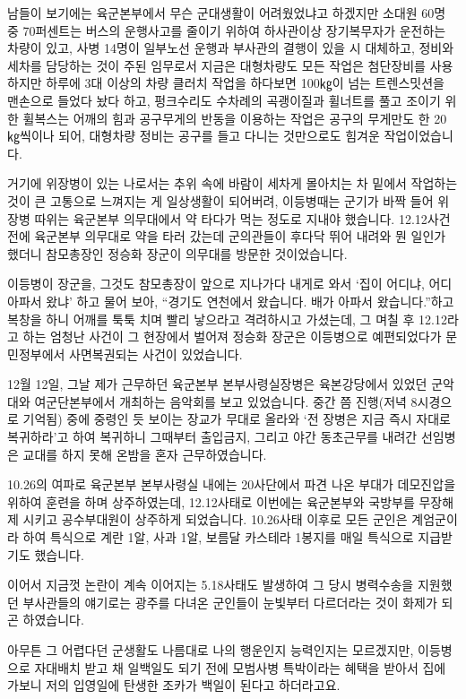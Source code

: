 \documentclass[chapter,book,openany,twoside]{oblivoir}
\begin{document}
남들이 보기에는 육군본부에서 무슨 군대생활이 어려웠었냐고 하겠지만 소대원 60명 중 70퍼센트는 버스의 운행사고를 줄이기 위하여 하사관이상 장기복무자가 운전하는 차량이 있고, 사병 14명이 일부노선 운행과 부사관의 결행이 있을 시 대체하고, 정비와 세차를 담당하는 것이 주된 임무로서 지금은 대형차량도 모든 작업은 첨단장비를 사용하지만 하루에 3대 이상의 차량 클러치 작업을 하다보면 100㎏이 넘는 트렌스밋션을 맨손으로 들었다 놨다 하고, 펑크수리도 수차례의 곡괭이질과 휠너트를 풀고 조이기 위한 휠복스는 어깨의 힘과 공구무게의 반동을 이용하는 작업은 공구의 무게만도 한 20㎏씩이나 되어, 대형차량 정비는 공구를 들고 다니는 것만으로도 힘겨운 작업이었습니다.

거기에 위장병이 있는 나로서는 추위 속에 바람이 세차게 몰아치는 차 밑에서 작업하는 것이 큰 고통으로 느껴지는 게 일상생활이 되어버려, 이등병때는 군기가 바짝 들어 위장병 따위는 육군본부 의무대에서 약 타다가 먹는 정도로 지내야 했습니다. 12.12사건 전에 육군본부 의무대로 약을 타러 갔는데 군의관들이 후다닥 뛰어 내려와 뭔 일인가 했더니 참모총장인 정승화 장군이 의무대를 방문한 것이었습니다.

이등병이 장군을, 그것도 참모총장이 앞으로 지나가다 내게로 와서 `집이 어디냐, 어디 아파서 왔냐' 하고 물어 보아, ``경기도 연천에서 왔습니다. 배가 아파서 왔습니다.''하고 복창을 하니 어깨를 툭툭 치며 빨리 낳으라고 격려하시고 가셨는데, 그 며칠 후 12.12라고 하는 엄청난 사건이 그 현장에서 벌어져 정승화 장군은 이등병으로 예편되었다가 문민정부에서 사면복권되는 사건이 있었습니다.

12월 12일, 그날 제가 근무하던 육군본부 본부사령실장병은 육본강당에서 있었던 군악대와 여군단본부에서 개최하는 음악회를 보고 있었습니다. 중간 쯤 진행(저녁 8시경으로 기억됨) 중에 중령인 듯 보이는 장교가 무대로 올라와 `전 장병은 지금 즉시 자대로 복귀하라'고 하여 복귀하니 그때부터 출입금지, 그리고 야간 동초근무를 내려간 선임병은 교대를 하지 못해 온밤을 혼자 근무하였습니다.

10.26의 여파로 육군본부 본부사령실 내에는 20사단에서 파견 나온 부대가 데모진압을 위하여 훈련을 하며 상주하였는데, 12.12사태로 이번에는 육군본부와 국방부를 무장해제 시키고 공수부대원이 상주하게 되었습니다. 10.26사태 이후로 모든 군인은 계엄군이라 하여 특식으로 계란 1알, 사과 1알, 보름달 카스테라 1봉지를 매일 특식으로 지급받기도 했습니다.

이어서 지금껏 논란이 계속 이어지는 5.18사태도 발생하여 그 당시 병력수송을 지원했던 부사관들의 얘기로는 광주를 다녀온 군인들이 눈빛부터 다르더라는 것이 화제가 되곤 하였습니다. 

아무튼 그 어렵다던 군생활도 나름대로 나의 행운인지 능력인지는 모르겠지만, 이등병으로 자대배치 받고 채  일백일도 되기 전에 모범사병 특박이라는 혜택을 받아서 집에 가보니 저의 입영일에 탄생한 조카가 백일이 된다고 하더라고요.
\end{document}
